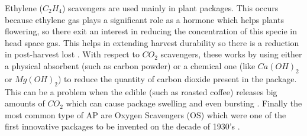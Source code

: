 \begin{refsection}
Ethylene ($C_2H_4$) scavengers are used mainly in plant packages. This occurs because ethylene gas plays a significant role as a hormone which helps plants flowering, so there exit an interest in reducing the concentration of this specie in head space gas. This helps in  extending harvest durability so there is a reduction in  post-harvest lost \cite{Gaikwad2020EthyleneProduce}. With respect to $CO_2$ scavengers, these works by using either a physical absorbent (such as carbon powder) or a chemical one (like $Ca(OH)_2$ or $Mg(OH)_2$) to reduce the quantity of carbon dioxide present in the package. This can be a problem when the edible (such as roasted coffee) releases big amounts of $CO_2$ which can cause package swelling and even bursting \cite{robertson2016food}. 
Finally the most common type of AP are Oxygen Scavengers (OS) which were one of the first innovative packages to be invented on the decade of 1930's  \cite{Singh2011ActiveTrends}. 
 

\end{refsection}
